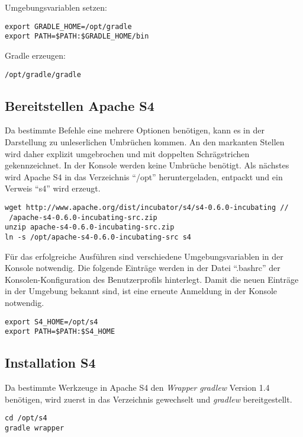 Umgebungsvariablen setzen:

\begin{verbatim}
export GRADLE_HOME=/opt/gradle
export PATH=$PATH:$GRADLE_HOME/bin
\end{verbatim}

Gradle erzeugen:

\begin{verbatim}
/opt/gradle/gradle
\end{verbatim}

\subsection{Bereitstellen Apache S4}

Da bestimmte Befehle eine mehrere Optionen benötigen, kann es in der Darstellung zu unleserlichen Umbrüchen kommen. An den markanten Stellen wird daher explizit umgebrochen und mit doppelten Schrägstrichen gekennzeichnet. In der Konsole werden keine Umbrüche benötigt. Als nächstes wird Apache S4 in das Verzeichnis "`/opt"' heruntergeladen, entpackt und ein Verweis "`s4"' wird erzeugt.

\begin{verbatim}
wget http://www.apache.org/dist/incubator/s4/s4-0.6.0-incubating //
 /apache-s4-0.6.0-incubating-src.zip
unzip apache-s4-0.6.0-incubating-src.zip
ln -s /opt/apache-s4-0.6.0-incubating-src s4
\end{verbatim}

Für das erfolgreiche Ausführen sind verschiedene Umgebungsvariablen in der Konsole notwendig. Die folgende Einträge werden in der Datei "`.bashrc"' der Konsolen-Konfiguration des Benutzerprofils hinterlegt. Damit die neuen Einträge in der Umgebung bekannt sind, ist eine erneute Anmeldung in der Konsole notwendig.

\begin{verbatim}
export S4_HOME=/opt/s4
export PATH=$PATH:$S4_HOME
\end{verbatim}

\subsection{Installation S4}

Da bestimmte Werkzeuge in Apache S4 den \textit{Wrapper} \textit{gradlew} Version 1.4 benötigen, wird zuerst in das Verzeichnis gewechselt und \textit{gradlew} bereitgestellt.

\begin{verbatim}
cd /opt/s4
gradle wrapper
\end{verbatim}

